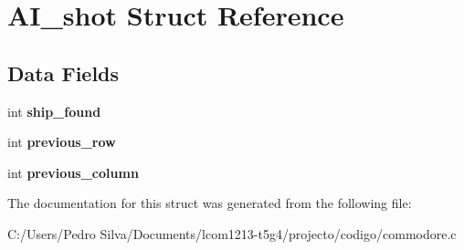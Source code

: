 \hypertarget{struct_a_i__shot}{\section{A\-I\-\_\-shot Struct Reference}
\label{struct_a_i__shot}
}
\subsection*{Data Fields}
\begin{DoxyCompactItemize}
\item 
\hypertarget{struct_a_i__shot_ae8ef6e458d847b47a404df451324c903}{int {\bfseries ship\-\_\-found}}\label{struct_a_i__shot_ae8ef6e458d847b47a404df451324c903}

\item 
\hypertarget{struct_a_i__shot_aa4b2188a8324fdac06c80259b3c136fe}{int {\bfseries previous\-\_\-row}}\label{struct_a_i__shot_aa4b2188a8324fdac06c80259b3c136fe}

\item 
\hypertarget{struct_a_i__shot_a1fcdf901cbaa3a98e43eb3450ebd2d39}{int {\bfseries previous\-\_\-column}}\label{struct_a_i__shot_a1fcdf901cbaa3a98e43eb3450ebd2d39}

\end{DoxyCompactItemize}


The documentation for this struct was generated from the following file\-:\begin{DoxyCompactItemize}
\item 
C\-:/\-Users/\-Pedro Silva/\-Documents/lcom1213-\/t5g4/projecto/codigo/commodore.\-c\end{DoxyCompactItemize}
